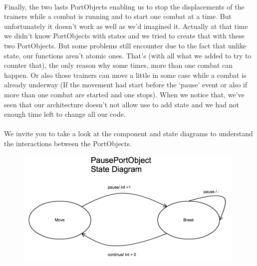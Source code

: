 \documentclass[a4paper,10pt]{article}
\begin{document}
\paragraph{}
Finally, the two lasts PortObjects enabling us to stop the displacements of the trainers while a combat is running and to start one combat at a time.  But unfortunately it doesn’t work as well as we’d imagined it. Actually at that time we didn’t know PortObjects with states and we tried to create that with these two PortObjects. But some problems still encounter due to the fact that unlike state, our functions aren’t atomic ones.  That’s (with all what we added to try to counter that), the only reason why some times, more than one combat can happen. Or also those trainers can move a little in some case while a combat is already underway (If the movement had start before the ‘pause’ event or also if more than one combat are started and one stops). When we notice that, we’ve seen that our architecture doesn’t not allow use to add state and we had not enough time left to change all our code.
\paragraph{}
We invite you to take a look at the component and state diagrams to understand the interactions between the PortObjects.

      
\begin{figure}[h!]
      \begin{center}
      \includegraphics[scale=1]{State_diag_PPO.png}
      \end{center}
      \end{figure}
      
\end{document}
